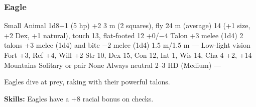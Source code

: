 \subsubsection{Eagle}
\begin{MonsterStats}
{Small Animal}
{1d8+1 (5 hp)}
{+2}
{3 m (2 squares), fly 24 m (average)}
{14 (+1 size, +2 Dex, +1 natural), touch 13, flat-footed 12}
{+0/$-4$}
{Talon +3 melee (1d4)}
{2 talons +3 melee (1d4) and bite $-2$ melee (1d4)}
{1.5 m/1.5 m}
{---}
{Low-light vision}
{Fort +3, Ref +4, Will +2}
{Str 10, Dex 15, Con 12, Int 1, Wis 14, Cha 4}
{ +2,  +14}
{}
{Mountains}
{Solitary or pair}
{\onehalf}
{None}
{Always neutral}
{2--3 HD (Medium)}
{---}
\end{MonsterStats}


Eagles dive at prey, raking with their powerful talons.

\textbf{Skills:} Eagles have a +8 racial bonus on  checks.
